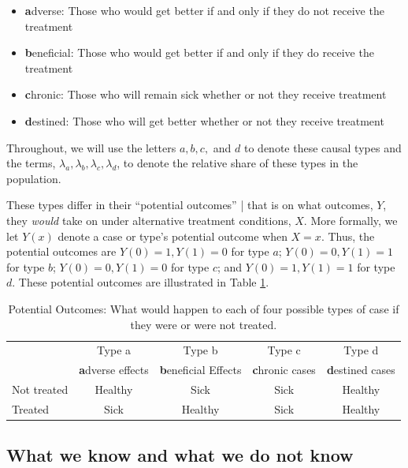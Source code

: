 \documentclass[11pt]{article}
\begin{document}
\begin{itemize}
    \item \textbf{a}dverse: Those who would get better if and only if they do not receive the treatment
    \item \textbf{b}eneficial: Those who would get better if and only if they do receive the treatment
    \item \textbf{c}hronic: Those who will remain sick whether or not they receive treatment
    \item \textbf{d}estined: Those who will get better whether or not they receive treatment
\end{itemize}

Throughout, we will use the letters $a,b,c,$ and $d$ to denote these causal types and the terms, $\lambda_a,\lambda_b,\lambda_c,\lambda_d$, to denote the relative share of these types in the population. 

These types differ in their ``potential outcomes'' | that is on what outcomes, $Y$,  they \textit{would} take on under alternative treatment conditions, $X$. More formally, we let $Y(x)$ denote a case or type's potential outcome  when $X=x$. Thus, the potential outcomes are $Y(0)=1, Y(1)=0$ for type $a$; $Y(0)=0, Y(1)=1$ for type $b$; $Y(0)=0, Y(1)=0$ for type $c$; and $Y(0)=1, Y(1)=1$ for type $d$.  These potential outcomes are illustrated in Table \ref{tabPO}.


\begin{table}[h!]
\begin{tabular}{l|cccc} \small

& Type a & Type b & Type c & Type d \\

& \textbf{a}dverse effects & \textbf{b}eneficial Effects & \textbf{c}hronic cases & \textbf{d}estined cases \\
\hline
Not treated &    Healthy &       Sick &       Sick &    Healthy \\
Treated &       Sick &    Healthy &       Sick &    Healthy \\
\end{tabular}  
\caption{Potential Outcomes: What would happen to each of four possible types of case if they were or were not treated.}
\label{tabPO}
\end{table}


\subsection{What we know and what we do not know}
\end{document}
